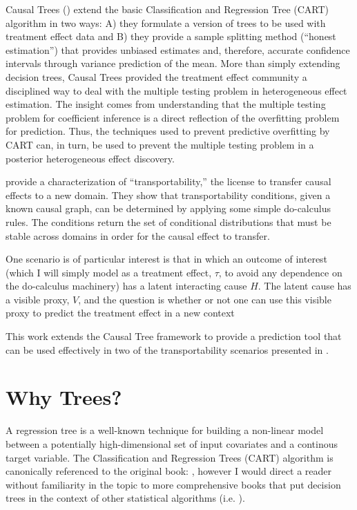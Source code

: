 \documentclass[a4paper,12pt]{article}
\theoremstyle{proposition}
\begin{document}
Causal Trees (\cite{Athey2016}) extend the basic Classification and Regression Tree (CART) algorithm in two ways: A) they formulate a version of trees to be used with treatment effect data and B) they provide a sample splitting method (``honest estimation'') that provides unbiased estimates and, therefore, accurate confidence intervals through variance prediction of the mean. More than simply extending decision trees, Causal Trees provided the treatment effect community a disciplined way to deal with the multiple testing problem in heterogeneous effect estimation. The insight comes from understanding that the multiple testing problem for coefficient inference is a direct reflection of the overfitting problem for prediction. Thus, the techniques used to prevent predictive overfitting by CART can, in turn, be used to prevent the multiple testing problem in a posterior heterogeneous effect discovery.

\cite{Pearl2014} provide a characterization of ``transportability,'' the license to transfer causal effects to a new domain. They show that transportability conditions, given a known causal graph, can be determined by applying some simple do-calculus rules. The conditions return the set of conditional distributions that must be stable across domains in order for the causal effect to transfer.

One scenario is of particular interest is that in which an outcome of interest (which I will simply model as a treatment effect, $\tau$, to avoid any dependence on the do-calculus machinery) has a latent interacting cause $H$. The latent cause has a visible proxy, $V$, and the question is whether or not one can use this visible proxy to predict the treatment effect in a new context

This work extends the Causal Tree framework to provide a prediction tool that can be used effectively in two of the transportability scenarios presented in \cite{Pearl2014}.

\section{Why Trees?}

A regression tree is a well-known technique for building a non-linear model between a potentially high-dimensional set of input covariates and a continous target variable. The Classification and Regression Trees (CART) algorithm is canonically referenced to the original book: \cite{breiman1984classification}, however I would direct a reader without familiarity in the topic to more comprehensive books that put decision trees in the context of other statistical algorithms (i.e. \cite{bishop2006pattern}).
\end{document}
